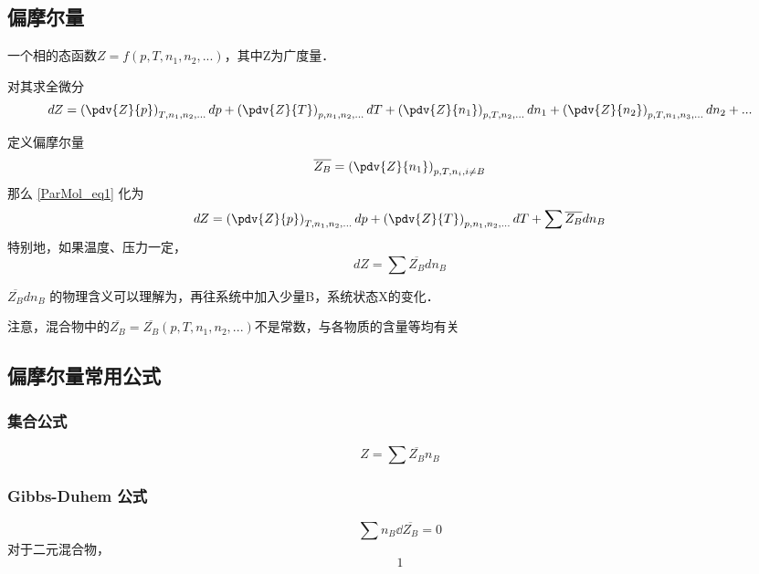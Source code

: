 
\subsection{偏摩尔量}
一个相的态函数$Z=f(p,T,n_1,n_2,...)$，其中Z为广度量．

对其求全微分  
\begin{equation}\label{ParMol_eq1}
dZ = \left(\pdv{Z}{p}\right)_{T,n_1,n_2,...}dp + \left(\pdv{Z}{T}\right)_{p,n_1,n_2,...}dT+\left(\pdv{Z}{n_1}\right)_{p,T,n_2,...}dn_1+\left(\pdv{Z}{n_2}\right)_{p,T,n_1,n_3,...}dn_2+...
\end{equation}

定义偏摩尔量
\begin{equation}
\overline {Z_B} = \left(\pdv{Z}{n_1}\right)_{p,T,n_i, i \neq B} 
\end{equation}
那么 \autoref{ParMol_eq1} 化为 
\begin{equation}
dZ = \left(\pdv{Z}{p}\right)_{T,n_1,n_2,...}dp + \left(\pdv{Z}{T}\right)_{p,n_1,n_2,...}dT+\sum \overline {Z_B} dn_B
\end{equation}
特别地，如果温度、压力一定，
\begin{equation}\label{ParMol_eq3}
dZ = \sum \overline {Z_B} dn_B
\end{equation}

$\overline {Z_B} d n_B$ 的物理含义可以理解为，再往系统中加入少量B，系统状态X的变化．

注意，混合物中的$\overline {Z_B}=\overline {Z_B}(p,T,n_1,n_2,...)$不是常数，与各物质的含量等均有关

\subsection{偏摩尔量常用公式}
\subsubsection{集合公式}
\begin{equation}\label{ParMol_eq2}
Z=\sum \overline {Z_B}  n_B
\end{equation}
\subsubsection{Gibbs-Duhem 公式}
\begin{equation}
\sum n_B \dd {\overline {Z_B}} = 0
\end{equation}
对于二元混合物，
\begin{equation}
1
\end{equation}



